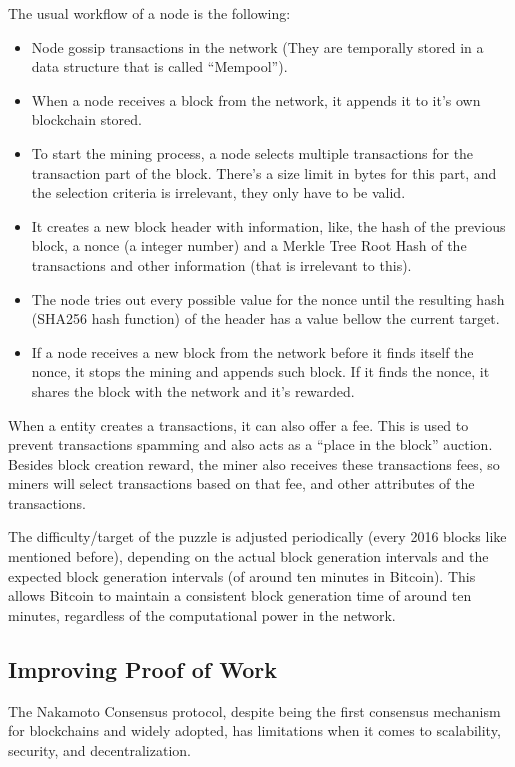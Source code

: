 The usual workflow of a node is the following:
\begin{itemize}
    \item Node gossip transactions in the network (They are temporally stored in a data structure that is called ``Mempool'').
    \item When a node receives a block from the network, it appends it to it's own blockchain stored.
    \item To start the mining process, a node selects multiple transactions for the transaction part of the block. There's a size limit in bytes for this part, and the selection criteria is irrelevant, they only have to be valid.
    \item It creates a new block header with information, like, the hash of the previous block, a nonce (a integer number) and a Merkle Tree Root Hash of the transactions and other information (that is irrelevant to this).
    \item The node tries out every possible value for the nonce until the resulting hash (SHA256 hash function) of the header has a value bellow the current target.
    \item If a node receives a new block from the network before it finds itself the nonce, it stops the mining and appends such block. If it finds the nonce, it shares the block with the network and it's rewarded.
    
\end{itemize}

When a entity creates a transactions, it can also offer a fee. This is used to prevent transactions spamming and also acts as a ``place in the block'' auction.
Besides block creation reward, the miner also receives these transactions fees, so miners will select transactions based on that fee, and other attributes of the transactions.

The difficulty/target of the puzzle is adjusted periodically (every 2016 blocks like mentioned before), depending on the actual block generation intervals and the expected block generation intervals (of around ten minutes in Bitcoin). 
This allows Bitcoin to maintain a consistent block generation time of around ten minutes, regardless of the computational power in the network.

\subsection*{Improving Proof of Work}

The Nakamoto Consensus protocol, despite being the first consensus mechanism for block\-chains and widely adopted, has limitations when it comes to scalability, security, and decentralization.

